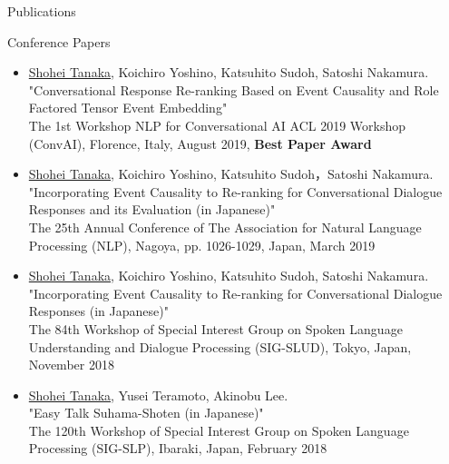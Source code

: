 \documentclass{resume} %
\begin{document}

\begin{rSection}{Publications}

\begin{rSubsection}{Conference Papers}{}{}{}
\begin{itemize}
\item \underline{Shohei Tanaka}, Koichiro Yoshino, Katsuhito Sudoh, Satoshi Nakamura.
\\"Conversational Response Re-ranking Based on Event Causality and Role Factored Tensor Event Embedding"
\\The 1st Workshop NLP for Conversational AI ACL 2019 Workshop (ConvAI), Florence, Italy, August 2019, {\bf Best Paper Award}

\item \underline{Shohei Tanaka}, Koichiro Yoshino, Katsuhito Sudoh，Satoshi Nakamura.
\\"Incorporating Event Causality to Re-ranking for Conversational Dialogue Responses and its Evaluation (in Japanese)"
\\The 25th Annual Conference of The Association for Natural Language Processing (NLP), Nagoya, pp. 1026-1029, Japan, March 2019

\item \underline{Shohei Tanaka}, Koichiro Yoshino, Katsuhito Sudoh, Satoshi Nakamura.
\\"Incorporating Event Causality to Re-ranking for Conversational Dialogue Responses (in Japanese)"
\\The 84th Workshop of Special Interest Group on Spoken Language Understanding and Dialogue Processing (SIG-SLUD), Tokyo, Japan, November 2018

\item \underline{Shohei Tanaka}, Yusei Teramoto, Akinobu Lee.
\\"Easy Talk Suhama-Shoten (in Japanese)"
\\The 120th Workshop of Special Interest Group on Spoken Language Processing (SIG-SLP), Ibaraki, Japan, February 2018
\end{itemize}
\end{rSubsection}

\end{rSection}

\end{document}
